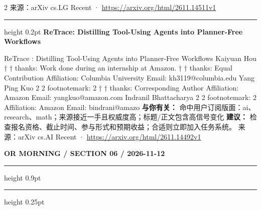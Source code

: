 \documentclass[10.5pt]{ctexart}
\begin{document}
\begin{multicols}{2}
{\footnotesize\color{ormuted} 来源：arXiv cs.LG Recent · \url{https://arxiv.org/html/2611.14511v1}}
\vspace{2mm}
\hrule height 0.2pt
\vspace{2mm}
{\large\bfseries ReTrace: Distilling Tool-Using Agents into Planner-Free Workflows}\par
ReTrace : Distilling Tool-Using Agents into Planner-Free Workflows Kaiyuan Hou † † thanks: Work done during an internship at Amazon. † † thanks: Equal Contribution Affiliation: Columbia University Email: kh3119@columbia.edu Yang Ping Kuo 2 2 footnotemark: 2 † † thanks: Corresponding Author Affiliation: Amazon Email: yangkuo@amazon.com Indranil Bhattacharya 2 2 footnotemark: 2 Affiliation: Amazon Email: bindrani@amazo
\textbf{与你有关：} 命中用户订阅版面：ai、research、math；来源接近一手且权威度高；标题/正文包含高信号变化
\textbf{建议：} 检查报名资格、截止时间、参与形式和预期收益；合适则立即加入任务系统。
{\footnotesize\color{ormuted} 来源：arXiv cs.AI Recent · \url{https://arxiv.org/html/2611.14492v1}}
\end{multicols}
\newpage
{\small\bfseries OR MORNING / SECTION 06 / 2026-11-12}
\vspace{2mm}
\hrule height 0.9pt
\vspace{1.5mm}
\hrule height 0.25pt
\vspace{4mm}
\end{document}
